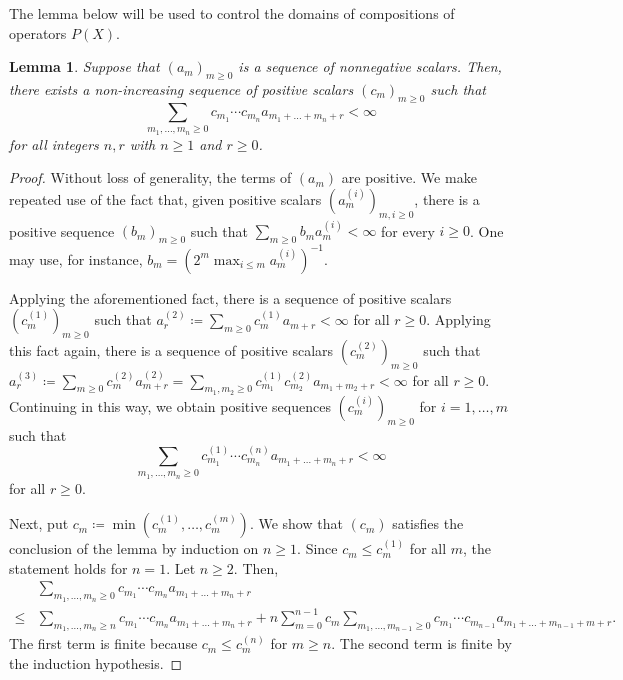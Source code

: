 \documentclass[12pt]{article}
\theoremstyle{plain}
\newtheorem{lemma}[thm]{Lemma}
\theoremstyle{definition}
\numberwithin{equation}{section}
\begin{document}
The lemma below will be used to control the domains of compositions of operators $P(X)$. 



\begin{lemma}
Suppose that $(a_m)_{m \geq 0}$ is a sequence of nonnegative scalars. Then, there exists a non-increasing sequence of positive scalars $(c_m)_{m \geq 0}$ such that
\[ \sum_{m_1,\ldots,m_n \geq 0 } c_{m_1}\cdots c_{m_n} a_{m_1+\ldots+m_n+r} < \infty \]
for all integers $n,r$ with $n \geq 1$ and $r \geq 0$. 
\end{lemma}
\begin{proof}
Without loss of generality, the terms of $(a_m)$ are positive. We make repeated use of the fact that, given positive scalars  $(a_m^{(i)})_{m, i\geq 0}$,  there is a positive sequence $(b_m)_{m\geq 0}$ such that $\sum_{m \geq 0} b_m a_m^{(i)} < \infty$ for every $i \geq 0$. One may use, for instance, $b_m = \left( 2^m  \max_{i \leq m}  a_m^{(i)}    \right)^{-1}$. 

Applying the aforementioned fact, there is a sequence of positive scalars   $(c^{(1)}_m)_{m \geq 0}$  such that  $a_r^{(2)} \coloneqq \sum_{m \geq 0} c^{(1)}_m a_{m+r}<\infty$ for all $r \geq 0$. Applying this fact again, there is a sequence of positive scalars  $(c^{(2)}_m)_{m \geq 0}$ such that  $a_r^{(3)} \coloneqq \sum_{m \geq 0} c^{(2)}_m a_{m+r}^{(2)} = \sum_{m_1,m_2 \geq 0} c^{(1)}_{m_1} c^{(2)}_{m_2} a_{m_1+m_2+r}<\infty$ for all $r \geq 0$. Continuing in this way, we obtain positive sequences $(c_m^{(i)})_{m \geq 0}$ for $i=1,\ldots,m$ such that
\[ \sum_{m_1,\ldots,m_n \geq 0 } c_{m_1}^{(1)} \cdots c_{m_n}^{(n)} a_{m_1+\ldots+m_n+r} < \infty \]
for all $r \geq 0$.

Next, put $c_m \coloneqq \min(c_m^{(1)},\ldots, c_m^{(m)})$. We show that $(c_m)$ satisfies the conclusion of the lemma  by induction on $n \geq 1$. Since $c_m \leq c_m^{(1)}$ for all $m$, the statement holds for $n=1$. Let $n \geq 2$. Then, 
\begin{align*}
&
\sum_{m_1,\ldots,m_n \geq 0 } c_{m_1}\cdots c_{m_n} a_{m_1+\ldots+m_n+r} \\
\leq & 
\sum_{m_1,\ldots, m_n \geq n} c_{m_1}\cdots c_{m_n} a_{m_1+\ldots+m_n+r} +   n\sum_{m=0}^{n-1} c_m \sum_{m_1,\ldots,m_{n-1} \geq 0}
 c_{m_1}\cdots c_{m_{n-1}} a_{m_1+\ldots+m_{n-1}+m+r}. 
\end{align*}
The first term is finite because $c_m \leq c^{(n)}_m$ for $m \geq n$. The second term is finite by the induction hypothesis.
\end{proof}
\end{document}
